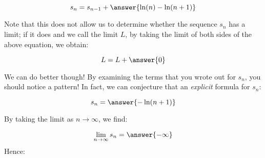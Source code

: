 \documentclass{ximera}
\begin{document}
\begin{exercise}
\begin{exercise}
\begin{hint}
\begin{question}
\begin{question}
 \[
 s_n= s_{n-1} + \answer{\ln(n)-\ln(n+1)}
 \]
 
Note that this does not allow us to determine whether the sequence $s_n$ has a limit; if it does and we call the limit $L$, by taking the limit of both sides of the above equation, we obtain:

\[
L = L +\answer{0}
\]

We can do better though!  By examining the terms that you wrote out for $s_n$, you should notice a pattern!  In fact, we can conjecture that an \emph{explicit} formula for $s_n$:

\[
s_n = \answer{-\ln(n+1)}
\]
\begin{question}
By taking the limit as $n \to \infty$, we find:

\[
\lim_{n \to \infty} s_n = \answer{-\infty}
\]
Hence:
\begin{multipleChoice}
\end{multipleChoice}

\end{question}
\end{question}
\end{question}
\end{hint}

\end{exercise}
\end{exercise}
\end{document}
